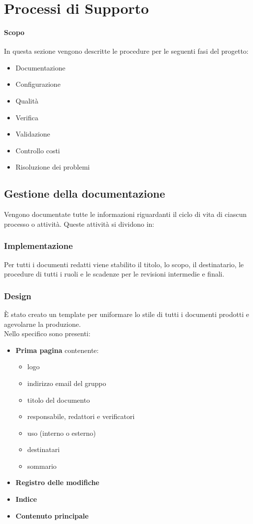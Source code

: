 \section{Processi di Supporto}
\paragraph{Scopo} In questa sezione vengono descritte le procedure per le seguenti fasi del progetto:
\begin{itemize}
    \item {Documentazione}
    \item {Configurazione}
    \item {Qualità}
    \item {Verifica}
    \item {Validazione}
    \item {Controllo costi}
    \item {Risoluzione dei problemi}
\end{itemize}
\subsection{Gestione della documentazione}
Vengono documentate tutte le informazioni riguardanti il ciclo di vita di ciascun processo o attività.
Queste attività si dividono in:
\subsubsection{Implementazione} 
Per tutti i documenti redatti viene stabilito il titolo, lo scopo, il destinatario, le procedure di tutti i ruoli e le scadenze per le revisioni intermedie e finali.
\subsubsection{Design} 
È stato creato un template per uniformare lo stile di tutti i documenti prodotti e agevolarne la produzione.\\
Nello specifico sono presenti:
\begin{itemize}
    \item \textbf{Prima pagina} contenente:
    \begin {itemize} 
        \item logo
        \item indirizzo email del gruppo
        \item titolo del documento
        \item responsabile, redattori e verificatori
        \item uso (interno o esterno)
        \item destinatari
        \item sommario
    \end{itemize}
    \item \textbf{Registro delle modifiche}
    \item \textbf{Indice}
    \item \textbf{Contenuto principale}

\end{itemize}



